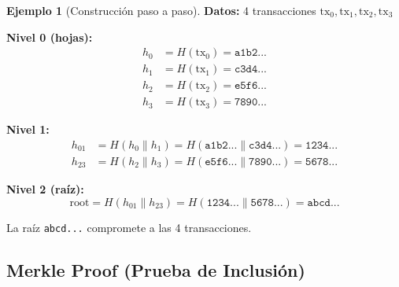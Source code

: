 \documentclass[11pt,a4paper,twoside,openright]{book}
\theoremstyle{definition}
\newtheorem{example}{Ejemplo}[chapter]
\theoremstyle{plain}
\theoremstyle{remark}
\begin{document}
\begin{center}
\end{center}

\begin{example}[Construcción paso a paso]
\textbf{Datos:} 4 transacciones $\text{tx}_0, \text{tx}_1, \text{tx}_2, \text{tx}_3$

\textbf{Nivel 0 (hojas):}
\begin{align}
h_0 &= H(\text{tx}_0) = \texttt{a1b2...} \\
h_1 &= H(\text{tx}_1) = \texttt{c3d4...} \\
h_2 &= H(\text{tx}_2) = \texttt{e5f6...} \\
h_3 &= H(\text{tx}_3) = \texttt{7890...}
\end{align}

\textbf{Nivel 1:}
\begin{align}
h_{01} &= H(h_0 \| h_1) = H(\texttt{a1b2...} \| \texttt{c3d4...}) = \texttt{1234...} \\
h_{23} &= H(h_2 \| h_3) = H(\texttt{e5f6...} \| \texttt{7890...}) = \texttt{5678...}
\end{align}

\textbf{Nivel 2 (raíz):}
\[ \text{root} = H(h_{01} \| h_{23}) = H(\texttt{1234...} \| \texttt{5678...}) = \texttt{abcd...} \]

La raíz \texttt{abcd...} compromete a las 4 transacciones.
\end{example}

\subsection{Merkle Proof (Prueba de Inclusión)}
\end{document}
